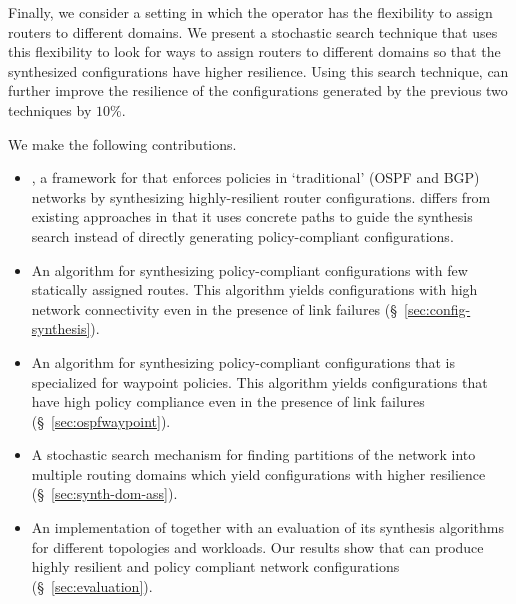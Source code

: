 Finally, we consider a setting in which the operator has the
flexibility to assign routers to different domains.  We present a
stochastic search technique that uses this flexibility to look for
ways to assign routers to different domains so that the synthesized
configurations have higher resilience.  Using this search technique,
\name can further improve the resilience of the configurations
generated by the previous two techniques by $10\%$.




 We make the following contributions.
\begin{itemize}	
    \item \name, a framework for
	that enforces policies in `traditional' (OSPF and BGP) networks
	by synthesizing highly-resilient router configurations. 		
	\name differs from existing approaches in that it uses concrete
	paths to guide the synthesis search instead of directly generating policy-compliant
	configurations.

	\item An algorithm for synthesizing policy-compliant
          configurations with few statically assigned routes. This
          algorithm yields configurations with high network
          connectivity even in the presence of link failures
          (\S~\ref{sec:config-synthesis}).

	\item An algorithm for synthesizing policy-compliant 		
		 configurations that is specialized for waypoint policies. 
		 This algorithm yields configurations that have
		 high policy compliance even in the presence of link failures (\S~\ref{sec:ospfwaypoint}). 
	
	\item A stochastic search mechanism for finding 
		partitions of the network into multiple routing domains which
		yield configurations with higher resilience (\S~\ref{sec:synth-dom-ass}).
	
	\item An implementation of \name
	together with an evaluation of its synthesis algorithms
	 for different topologies and workloads. 
	 Our results show that \name can produce highly resilient and policy compliant
	 network configurations (\S~\ref{sec:evaluation}). 
\end{itemize}
